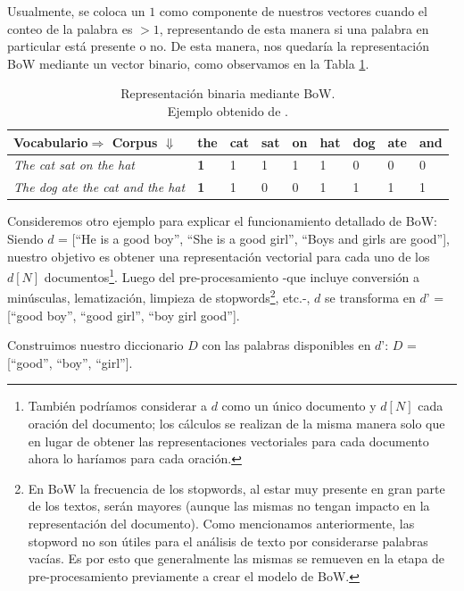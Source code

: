 \documentclass[12pt,a4paper]{article}
\begin{document}
\begin{sloppypar}
Usualmente, se coloca un $1$ como componente de nuestros vectores cuando el conteo de la palabra es $>1$, representando de esta manera si una palabra en particular está presente o no. De esta manera, nos quedaría la representación BoW mediante un vector binario, como observamos en la Tabla \ref{table:bow_2}.

\begin{table}[h!]
\centering
\begin{tabular}{|p{4cm}||p{1cm}|p{1cm}|p{1cm}|p{1cm}|p{1cm}|p{1cm}|p{1cm}|p{1cm}|}
\hline
\textbf{Vocabulario$\Rightarrow$ Corpus $\Downarrow$} & the & cat & sat & on & hat & dog & ate & and \\ [1ex] 
\hline
\textit{The cat sat on the hat} & \textbf{1} & 1 & 1 & 1 & 1 & 0 & 0 & 0 \\ 
\hline
\textit{The dog ate the cat and the hat} & \textbf{1} & 1 & 0 & 0 & 1 & 1 & 1 & 1 \\ 
\hline
\end{tabular}
\caption{Representación binaria mediante BoW.\\ Ejemplo obtenido de \cite{NLP_8}.} 
\label{table:bow_2}
\end{table}

Consideremos otro ejemplo para explicar el funcionamiento detallado de BoW\cite{NLP_2}: 
Siendo $d$ = [``He is a good boy'', ``She is a good girl'', ``Boys and girls are good''], nuestro objetivo es obtener una representación vectorial para cada uno de los $d[N]$ documentos\footnote{También podríamos considerar a $d$ como un único documento y $d[N]$ cada oración del documento; los cálculos se realizan de la misma manera solo que en lugar de obtener las representaciones vectoriales para cada documento ahora lo haríamos para cada oración.}.
Luego del pre-procesamiento -que incluye conversión a minúsculas, lematización, limpieza de stopwords\footnote{En BoW la frecuencia de los stopwords, al estar muy presente en gran parte de los textos, serán mayores (aunque las mismas no tengan impacto en la representación del documento). Como mencionamos anteriormente, las stopword no son útiles para el análisis de texto por considerarse palabras vacías. Es por esto que generalmente las mismas se remueven en la etapa de pre-procesamiento previamente a crear el modelo de BoW.}, etc.-, $d$ se transforma en $d’$ = [``good boy'', ``good girl'', ``boy girl good'']. 

Construimos nuestro diccionario $D$ con las palabras disponibles en $d’$: \hspace{3cm}
$D$ = [``good'', ``boy'', ``girl''].


\end{sloppypar}
\end{document}
